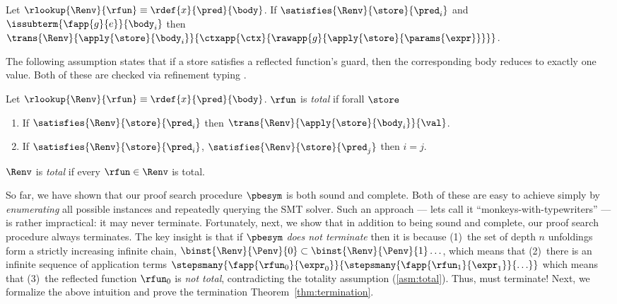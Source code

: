 \begin{lemma}\label{lem:subterm-eval}
Let $\rlookup{\Renv}{\rfun} \equiv \rdef{x}{\pred}{\body}$.
%
If $\satisfies{\Renv}{\store}{\pred_i}$ and $\issubterm{\fapp{g}{e}}{\body_i}$
then
$\trans{\Renv}{\apply{\store}{\body_i}}
              {\ctxapp{\ctx}{\rawapp{g}{\apply{\store}{\params{\expr}}}}}$.
\end{lemma}

%
The following assumption states that
if a store satisfies a reflected function's
guard, then the corresponding body reduces
to exactly one value.
%
Both of these are checked via
refinement typing \cite{Vazou14}.
%

\begin{lemma}\label{asm:total}
Let $\rlookup{\Renv}{\rfun} \equiv \rdef{x}{\pred}{\body}$.
%
$\rfun$ is \emph{total} if forall $\store$
%
\begin{enumerate}
\item If $\satisfies{\Renv}{\store}{\pred_i}$ then $\trans{\Renv}{\apply{\store}{\body_i}}{\val}$.
\item If $\satisfies{\Renv}{\store}{\pred_i}$, $\satisfies{\Renv}{\store}{\pred_j}$ then $i=j$.
\end{enumerate}
%
$\Renv$ is \emph{total} if every $\rfun \in \Renv$ is total.
%
\end{lemma}






So far, we have shown that our proof search
procedure $\pbesym$ is both sound and complete.
%
Both of these are easy to achieve
simply by \emph{enumerating} all possible
instances and repeatedly querying the SMT
solver.
%
Such an approach --- lets call it
``monkeys-with-typewriters'' --- is rather
impractical: it may never terminate.
%
Fortunately, next, we show that in addition
to being sound and complete, our proof search
procedure always terminates.
%
The key insight is that if $\pbesym$ \emph{does not terminate}
then it is because
%
(1)~the set of depth $n$ unfoldings form a strictly
    increasing infinite chain,
    $\binst{\Renv}{\Penv}{0} \subset \binst{\Renv}{\Penv}{1} \ldots$,
    which means that
(2)~there is an infinite sequence of application terms
    $\stepsmany{\fapp{\rfun_0}{\expr_0}}{\stepsmany{\fapp{\rfun_1}{\expr_1}}{\ldots}}$
    which means that
(3)~the reflected function $\rfun_0$ is \emph{not total}, contradicting the
    totality assumption (\ref{asm:total}).
%
Thus, \pbesym must terminate!
%
Next, we formalize the above intuition and
prove the termination Theorem~\ref{thm:termination}.

